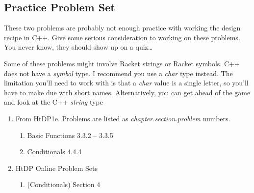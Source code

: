 \documentclass[]{tufte-handout}
\begin{document}
\newpage

\subsection{Practice Problem Set}

These two problems are probably not enough practice with working the design recipe in C++.  Give some serious consideration to working on these problems. You never know, they should show up on a quiz\ldots

Some of these problems might involve Racket strings or Racket symbols. C++ does not have a \textit{symbol} type.  I recommend you use a \textit{char} type instead.  The limitation you'll need to work with is that a \textit{char} value is a single letter, so you'll have to make due with short names.  Alternatively, you can get ahead of the game and look at the C++ \textit{string} type
\begin{enumerate}
\item From HtDP1e. Problems are listed as \textit{chapter.section.problem} numbers.
\begin{enumerate}
\item Basic Functions 3.3.2 -- 3.3.5
\item Conditionals 4.4.4
\end{enumerate}
\item HtDP Online Problem Sets
\begin{enumerate}
\item (Conditionals) Section 4
\end{enumerate}
\end{enumerate}
\end{document}
